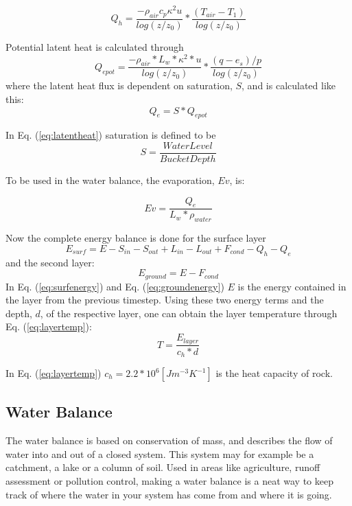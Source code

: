 \documentclass[a4paper,11pt,twocolumn]{article}
\begin{document}
\begin{equation}
Q_h = \frac{-\rho_{air}c_p\kappa^2u}{log(z/z_0)}* \frac{(T_{air}-T_1)}{log(z/z_0)}
\label{eq:sensibleheat}
\end{equation}

Potential latent heat is calculated through 
\begin{equation}
Q_{e pot} = \frac{-\rho_{air}*L_w*\kappa^2*u}{log(z/z_0)}*\frac{(q-e_s)/p}{log(z/z_0)}
\end{equation}
where the latent heat flux is dependent on saturation, $S$, and is calculated like this:
\begin{equation}
Q_e = S*Q_{e pot}
\label{eq:latentheat}
\end{equation}

In Eq. (\ref{eq:latentheat}) saturation is defined to be
\begin{equation}
S = \frac{Water Level}{Bucket Depth}
\end{equation}

To be used in the water balance, the evaporation, $Ev$, is: 

\begin{equation}
Ev = \frac{Q_e}{L_w*\rho_{water}}
\end{equation}

Now the complete energy balance is done for the surface layer \cite{dingman}  
\begin{equation}
	E_{surf} = E-S_{in}-S_{out}+L_{in}-L_{out}+F_{cond}-Q_h-Q_e
	\label{eq:surfenergy}
\end{equation}
and the second layer:
\begin{equation}
E_{ground} = E-F_{cond}
	\label{eq:groundenergy}
\end{equation}
In Eq. (\ref{eq:surfenergy}) and Eq. (\ref{eq:groundenergy}) $E$ is the energy contained in the layer from the previous timestep. Using these two energy terms and the depth, $d$, of the respective layer, one can obtain the layer temperature through Eq. (\ref{eq:layertemp}):
\begin{equation}
	T = \frac{E_{layer}}{c_h*d}
	\label{eq:layertemp}
\end{equation}

In Eq. (\ref{eq:layertemp}) $c_h = 2.2*10^6 [Jm^{-3}K^{-1}]$ is the heat capacity of rock.  


\subsection{Water Balance}
The water balance is based on conservation of mass, and describes the flow of water into and out of a closed system. This system may for example be a catchment, a lake or a column of soil. Used in areas like agriculture, runoff assessment or pollution control, making a water balance is a neat way to keep track of where the water in your system has come from and where it is going. 
\end{document}
